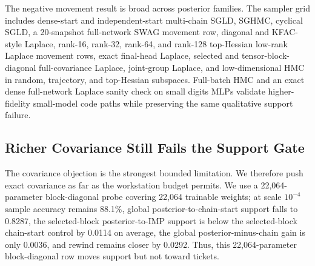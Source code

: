 \documentclass{article}
\begin{document}
The negative movement result is broad across posterior families. The sampler
grid includes dense-start and independent-start multi-chain SGLD, SGHMC,
cyclical SGLD, a 20-snapshot full-network SWAG movement row, diagonal and
KFAC-style Laplace, rank-16, rank-32, rank-64, and rank-128 top-Hessian
low-rank Laplace movement rows, exact final-head Laplace, selected and
tensor-block-diagonal full-covariance Laplace, joint-group Laplace, and
low-dimensional HMC in random, trajectory, and top-Hessian subspaces. Full-batch
HMC and an exact dense full-network Laplace sanity check on small digits MLPs
validate higher-fidelity small-model code paths while preserving the same
qualitative support failure.

\subsection{Richer Covariance Still Fails the Support Gate}

The covariance objection is the strongest bounded limitation. We therefore
push exact covariance as far as the workstation budget permits. We use a
22,064-parameter block-diagonal probe covering 22,064 trainable weights; at scale
$10^{-4}$ sample accuracy remains 88.1\%, global posterior-to-chain-start
support falls to 0.8287, the selected-block posterior-to-IMP support is below
the selected-block chain-start control by 0.0114 on average, the global
posterior-minus-chain gain is only 0.0036, and rewind remains closer by 0.0292.
Thus, this 22,064-parameter block-diagonal row moves support but not toward
tickets.
\end{document}
